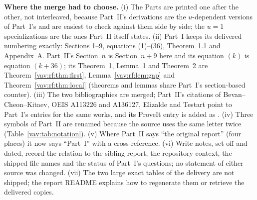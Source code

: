 \documentclass[11pt]{article}
\theoremstyle{remark}\newtheorem{remark}[theorem]{Remark}
\begin{document}
\textbf{Where the merge had to choose.}
(i) The Parts are printed one after the other, not interleaved, because
Part~II's derivations are the $u$-dependent versions of Part~I's and are
easiest to check against them side by side; the $u=1$ specializations
are the ones Part~II itself states. (ii) Part~I keeps its delivered
numbering exactly: Sections 1--9, equations (1)--(36), Theorem~1.1 and
Appendix~A. Part~II's Section~$n$ is Section~$n+9$ here and its equation
$(k)$ is equation $(k+36)$; its Theorem~1, Lemma~1 and Theorem~2 are
Theorem~\ref{vav:rf:thm:first}, Lemma~\ref{vav:rf:lem:gap} and
Theorem~\ref{vav:rf:thm:local} (theorems and lemmas share Part~I's
section-based counter). (iii) The two bibliographies are merged; Part~II's
citations of Bevan--Cheon--Kitaev, OEIS A113226 and A136127, Elizalde and
Testart point to Part~I's entries for the same works, and its ProveIt
entry is added as \cite{proveit}. (iv) Three symbols of Part~II are renamed
because the source uses the same letter twice (Table~\ref{vav:tab:notation}).
(v) Where Part~II says ``the original report'' (four places) it now says
``Part~I'' with a cross-reference. (vi) Write notes, set off and dated,
record the relation to the sibling report, the repository context, the
shipped file names and the status of Part~I's questions; no statement of
either source was changed. (vii) The two large exact tables of the
delivery are not shipped; the report README explains how to regenerate
them or retrieve the delivered copies.
\end{document}
